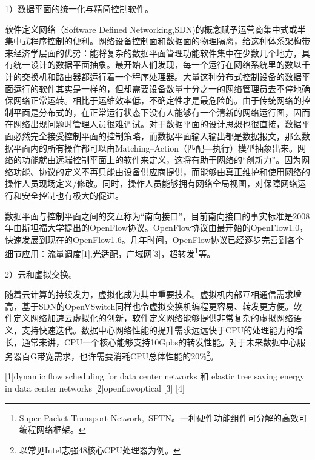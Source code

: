 

1）数据平面的统一化与精简控制软件。

软件定义网络（Software Defined Networking,SDN)的概念赋予运营商集中式或半集中式程序控制的便利。网络设备控制面和数据面的物理隔离，给这种体系架构带来经济学层面的优势：能将复杂的数据平面管理功能软件集中在少数几个地方，具有统一设计的数据平面抽象。最开始人们发现，每一个运行在网络系统里的数以千计的交换机和路由器都运行着一个程序处理器。大量这种分布式控制设备的数据平面运行的软件其实是一样的，但却需要设备数量十分之一的网络管理员去不停地确保网络正常运转。相比于运维效率低，不确定性才是最危险的。由于传统网络的控制平面是分布式的，在正常运行状态下没有人能够有一个清新的网络运行图，因而在网络出现问题时管理人员很难调试。对于数据平面的设计思想也很直接，数据平面必然完全接受控制平面的控制策略，而数据平面输入输出都是数据报文，那么数据平面内的所有操作都可以由Matching--Action（匹配---执行）模型抽象出来。网络的功能就由远端控制平面上的软件来定义，这将有助于网络的“创新力”。因为网络功能、协议的定义不再只能由设备供应商提供，而能够由真正维护和使用网络的操作人员现场定义/修改。同时，操作人员能够拥有网络全局视图，对保障网络运行和安全控制也有极大的促进。

数据平面与控制平面之间的交互称为“南向接口”，目前南向接口的事实标准是2008年由斯坦福大学提出的OpenFlow协议。OpenFlow协议由最开始的OpenFlow1.0，快速发展到现在的OpenFlow1.6。几年时间，OpenFlow协议已经逐步完善到各个细节应用：流量调度[1],光适配，广域网[3]，超转发\footnote{Super Packet Transport Network,~SPTN。一种硬件功能组件可分解的高效可编程网络框架。}等。

2）云和虚拟交换。

随着云计算的持续发力，虚拟化成为其中重要技术。虚拟机内部互相通信需求增高，基于SDN的OpenVSwitch同样也令虚拟交换机编程更容易、转发更方便。软件定义网络加速云虚拟化的创新，软件定义网络能够提供非常复杂的虚拟网络语义，支持快速迭代。数据中心网络性能的提升需求远远快于CPU的处理能力的增长，通常来讲，CPU一个核心能够支持10Gpbs的转发性能。对于未来数据中心服务器百G带宽需求，也许需要消耗CPU总体性能的20\%\footnote{以常见Intel志强48核心CPU处理器为例。}。

[1]dynamic flow scheduling for data center networks 和 elastic tree saving energy in data center networks
[2]openflowoptical
[3]
[4]


